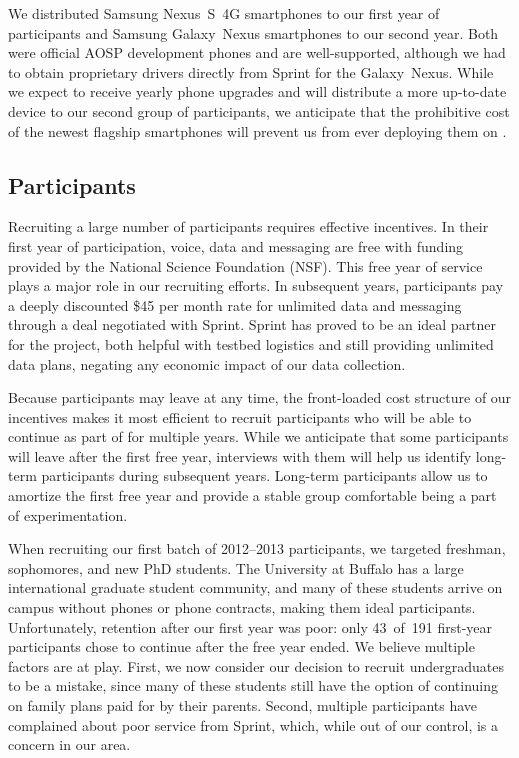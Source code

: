 We distributed Samsung Nexus~S~4G smartphones to our first year of
participants and Samsung Galaxy~Nexus smartphones to our second year. Both
were official AOSP development phones and are well-supported, although we had
to obtain proprietary drivers directly from Sprint for the Galaxy~Nexus.
While we expect to receive yearly phone upgrades and will distribute a more
up-to-date device to our second group of participants, we anticipate that the
prohibitive cost of the newest flagship smartphones will prevent us from ever
deploying them on \PhoneLab{}.



\subsection{Participants}

Recruiting a large number of \PhoneLab{} participants requires effective
incentives. In their first year of \PhoneLab{} participation, voice, data and
messaging are free with funding provided by the National Science Foundation
(NSF). This free year of service plays a major role in our recruiting
efforts. In subsequent years, participants pay a deeply discounted \$45 per
month rate for unlimited data and messaging through a deal negotiated with
Sprint. Sprint has proved to be an ideal partner for the \PhoneLab{} project,
both helpful with testbed logistics and still providing unlimited data plans,
negating any economic impact of our data collection.

Because participants may leave at any time, the front-loaded cost structure
of our incentives makes it most efficient to recruit participants who will be
able to continue as part of \PhoneLab{} for multiple years. While we
anticipate that some participants will leave after the first free year,
interviews with them will help us identify long-term participants during
subsequent years. Long-term participants allow us to amortize the first free
year and provide a stable group comfortable being a part of \PhoneLab{}
experimentation.

When recruiting our first batch of 2012--2013 participants, we targeted
freshman, sophomores, and new PhD students. The University at Buffalo has a
large international graduate student community, and many of these students
arrive on campus without phones or phone contracts, making them ideal
\PhoneLab{} participants. Unfortunately, retention after our first year was
poor: only 43~of~191 first-year participants chose to continue after the free
year ended. We believe multiple factors are at play. First, we now consider
our decision to recruit undergraduates to be a mistake, since many of these
students still have the option of continuing on family plans paid for by
their parents. Second, multiple participants have complained about poor
service from Sprint, which, while out of our control, is a concern in our
area.

